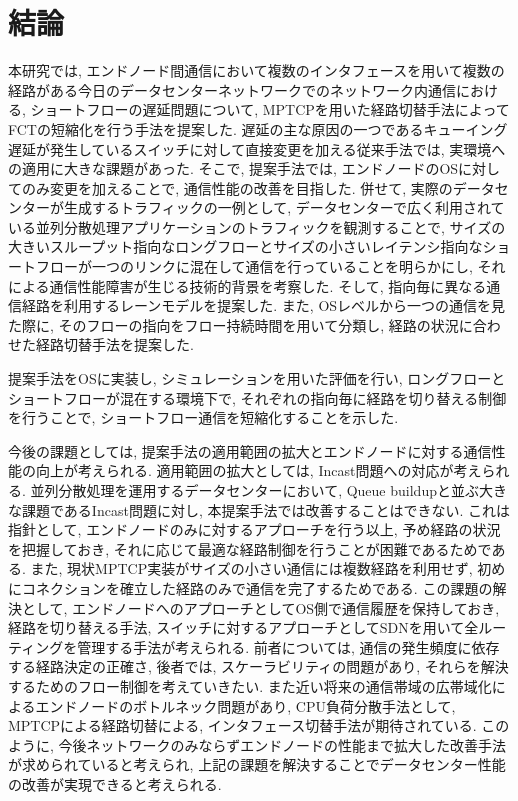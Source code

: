 \chapter{結論}
\label{chapter:conclusion}
本研究では, エンドノード間通信において複数のインタフェースを用いて複数の経路がある今日のデータセンターネットワークでのネットワーク内通信における,
ショートフローの遅延問題について, MPTCPを用いた経路切替手法によってFCTの短縮化を行う手法を提案した. 
遅延の主な原因の一つであるキューイング遅延が発生しているスイッチに対して直接変更を加える従来手法では, 実環境への適用に大きな課題があった. 
そこで, 提案手法では, エンドノードのOSに対してのみ変更を加えることで, 通信性能の改善を目指した. 
併せて, 実際のデータセンターが生成するトラフィックの一例として,
データセンターで広く利用されている並列分散処理アプリケーションのトラフィックを観測することで,
サイズの大きいスループット指向なロングフローとサイズの小さいレイテンシ指向なショートフローが一つのリンクに混在して通信を行っていることを明らかにし,
それによる通信性能障害が生じる技術的背景を考察した. 
そして, 指向毎に異なる通信経路を利用するレーンモデルを提案した. 
また, OSレベルから一つの通信を見た際に, そのフローの指向をフロー持続時間を用いて分類し, 経路の状況に合わせた経路切替手法を提案した. 

提案手法をOSに実装し, シミュレーションを用いた評価を行い, ロングフローとショートフローが混在する環境下で,
それぞれの指向毎に経路を切り替える制御を行うことで, ショートフロー通信を短縮化することを示した. 

今後の課題としては, 提案手法の適用範囲の拡大とエンドノードに対する通信性能の向上が考えられる. 
適用範囲の拡大としては, Incast問題への対応が考えられる. 
並列分散処理を運用するデータセンターにおいて, Queue buildupと並ぶ大きな課題であるIncast問題に対し, 本提案手法では改善することはできない. 
これは指針として, エンドノードのみに対するアプローチを行う以上, 予め経路の状況を把握しておき, それに応じて最適な経路制御を行うことが困難であるためである. 
また, 現状MPTCP実装がサイズの小さい通信には複数経路を利用せず, 初めにコネクションを確立した経路のみで通信を完了するためである. 
この課題の解決として, エンドノードへのアプローチとしてOS側で通信履歴を保持しておき, 経路を切り替える手法,
スイッチに対するアプローチとしてSDNを用いて全ルーティングを管理する手法が考えられる. 
前者については, 通信の発生頻度に依存する経路決定の正確さ, 後者では, スケーラビリティの問題があり, それらを解決するためのフロー制御を考えていきたい. 
また近い将来の通信帯域の広帯域化によるエンドノードのボトルネック問題があり, CPU負荷分散手法として, MPTCPによる経路切替による,
インタフェース切替手法が期待されている.
このように, 今後ネットワークのみならずエンドノードの性能まで拡大した改善手法が求められていると考えられ,
上記の課題を解決することでデータセンター性能の改善が実現できると考えられる. 

